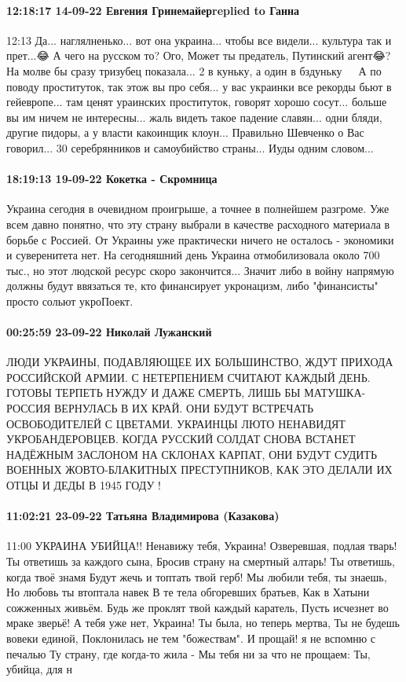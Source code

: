\paragraph{12:18:17 14-09-22 Евгения Гринемайерreplied to Ганна}
12:13
Да... наглялненько... вот она украина... чтобы все видели... культура так и
прет...😂 А чего на русском то? Ого, Может ты предатель, Путинский агент😂? На
молве бы сразу тризубец показала... 2 в куньку, а один в бздуньку 🤣🤣🤣 А по
поводу проституток, так этож вы про себя... у вас украинки все рекорды бьют в
гейевропе... там ценят ураинских проституток, говорят хорошо сосут... больше вы
им ничем не интересны... жаль видеть такое падение славян... одни бляди, другие
пидоры, а у власти какоинщик клоун... Правильно Шевченко о Вас говорил... 30
серебрянников и самоубийство страны... Иуды одним словом...


\paragraph{18:19:13 19-09-22 Кокетка - Скромница}

Украина сегодня в очевидном проигрыше, а точнее в полнейшем разгроме. Уже всем давно понятно, что эту страну выбрали в качестве расходного материала в борьбе с Россией.
От Украины уже практически ничего не осталось - экономики и суверенитета нет.
На сегодняшний день Украина отмобилизовала около 700 тыс., но этот людской ресурс скоро закончится...
Значит либо в войну напрямую должны будут ввязаться те, кто финансирует укронацизм, либо "финансисты" просто сольют укроПоект.

\paragraph{00:25:59 23-09-22 Николай Лужанский}
ЛЮДИ
УКРАИНЫ, ПОДАВЛЯЮЩЕЕ ИХ БОЛЬШИНСТВО, ЖДУТ ПРИХОДА РОССИЙСКОЙ АРМИИ. С НЕТЕРПЕНИЕМ
СЧИТАЮТ КАЖДЫЙ ДЕНЬ. ГОТОВЫ ТЕРПЕТЬ НУЖДУ И ДАЖЕ СМЕРТЬ, ЛИШЬ БЫ МАТУШКА-РОССИЯ
ВЕРНУЛАСЬ В ИХ КРАЙ. ОНИ БУДУТ ВСТРЕЧАТЬ ОСВОБОДИТЕЛЕЙ С ЦВЕТАМИ. УКРАИНЦЫ ЛЮТО
НЕНАВИДЯТ УКРОБАНДЕРОВЦЕВ. КОГДА РУССКИЙ СОЛДАТ СНОВА ВСТАНЕТ НАДЁЖНЫМ ЗАСЛОНОМ
НА СКЛОНАХ КАРПАТ, ОНИ БУДУТ СУДИТЬ ВОЕННЫХ ЖОВТО-БЛАКИТНЫХ ПРЕСТУПНИКОВ, КАК ЭТО ДЕЛАЛИ ИХ ОТЦЫ И ДЕДЫ В 1945 ГОДУ !

\paragraph{11:02:21 23-09-22 Татьяна Владимирова (Казакова)}
11:00
УКРАИНА УБИЙЦА!!
Ненавижу тебя, Украина!
Озверевшая, подлая тварь!
Ты ответишь за каждого сына,
Бросив страну на смертный алтарь!
Ты ответишь, когда твоё знамя
Будут жечь и топтать твой герб!
Мы любили тебя, ты знаешь,
Но любовь ты втоптала навек
В те тела обгоревших братьев,
Как в Хатыни сожженных живьём.
Будь же проклят твой каждый каратель,
Пусть исчезнет во мраке зверьё!
А тебя уже нет, Украина!
Ты была, но теперь мертва,
Ты не будешь вовеки единой,
Поклонилась не тем "божествам".
И прощай! я не вспомню с печалью
Ту страну, где когда-то жила -
Мы тебя ни за что не прощаем:
Ты, убийца, для н
